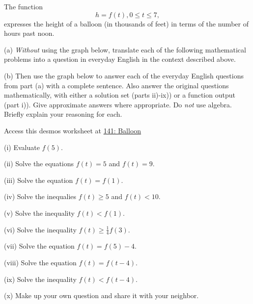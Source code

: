 \documentclass{ximera}
\begin{document}
\begin{example}  \label{Ex:er044}
The function
\[
    h = f(t) , 0\leq t \leq 7 ,
\]
expresses the height of a balloon (in thousands of feet) in terms of the number of hours past noon.

(a) \emph{Without} using the graph below, translate each of the following mathematical problems into a question in everyday English in  the context described above.

(b) Then use the graph below to answer each of the everyday English questions from part (a) with a complete sentence. Also answer the original questions mathematically, with either a solution set (parts ii)-ix)) or a function output (part i)). Give approximate answers where appropriate. Do \emph{not} use algebra. Briefly explain your reasoning for each.



 
\begin{onlineOnly}
    \begin{center}
\end{center}
\end{onlineOnly}

Access this desmos worksheet at \href{https://www.desmos.com/calculator/ddrjntgogr}{141: Balloon}


(i) Evaluate $f(5)$.

(ii) Solve the equations $f(t)=5$ and $f(t)=9$.

(iii) Solve the equation $f(t)=f(1)$.

(iv) Solve the inequalies $f(t)\geq 5$ and $f(t)<10$.

(v) Solve the inequality $f(t)< f(1)$.

(vi) Solve the inequality $f(t)\geq \frac{1}{4}f(3)$.

(vii) Solve the equation $f(t)=f(5) - 4$.

(viii) Solve the equation $f(t)=f(t-4)$.

(ix) Solve the inequality $f(t)<f(t-4)$.

(x) Make up your own question and share it with your neighbor.

\end{example}
\end{document}
